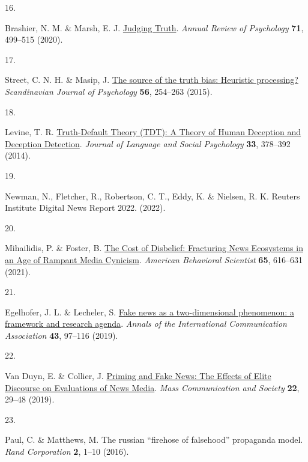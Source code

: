 \documentclass[
  doc,floatsintext]{apa6}
\newlength{\cslhangindent}
\newlength{\csllabelwidth}
\newenvironment{CSLReferences}[2] %
 {\begin{list}{}{%
  \setlength{\itemindent}{0pt}
  \setlength{\leftmargin}{0pt}
  \setlength{\parsep}{0pt}
  \ifodd #1
   \setlength{\leftmargin}{\cslhangindent}
   \setlength{\itemindent}{-1\cslhangindent}
  \fi
  \setlength{\itemsep}{#2\baselineskip}}}
 {\end{list}}
\newcommand{\CSLLeftMargin}[1]{\parbox[t]{\csllabelwidth}{\strut#1\strut}}
\newcommand{\CSLRightInline}[1]{\parbox[t]{\linewidth - \csllabelwidth}{\strut#1\strut}}
\begin{document}
\begin{CSLReferences}{0}{0}
\CSLLeftMargin{16. }%
\CSLRightInline{Brashier, N. M. \& Marsh, E. J. \href{https://doi.org/10.1146/annurev-psych-010419-050807}{Judging Truth}. \emph{Annual Review of Psychology} \textbf{71}, 499--515 (2020).}

\CSLLeftMargin{17. }%
\CSLRightInline{Street, C. N. H. \& Masip, J. \href{https://doi.org/10.1111/sjop.12204}{The source of the truth bias: Heuristic processing?} \emph{Scandinavian Journal of Psychology} \textbf{56}, 254--263 (2015).}

\CSLLeftMargin{18. }%
\CSLRightInline{Levine, T. R. \href{https://doi.org/10.1177/0261927X14535916}{Truth-Default Theory (TDT): A Theory of Human Deception and Deception Detection}. \emph{Journal of Language and Social Psychology} \textbf{33}, 378--392 (2014).}

\CSLLeftMargin{19. }%
\CSLRightInline{Newman, N., Fletcher, R., Robertson, C. T., Eddy, K. \& Nielsen, R. K. Reuters Institute Digital News Report 2022. (2022).}

\CSLLeftMargin{20. }%
\CSLRightInline{Mihailidis, P. \& Foster, B. \href{https://doi.org/10.1177/0002764220978470}{The Cost of Disbelief: Fracturing News Ecosystems in an Age of Rampant Media Cynicism}. \emph{American Behavioral Scientist} \textbf{65}, 616--631 (2021).}

\CSLLeftMargin{21. }%
\CSLRightInline{Egelhofer, J. L. \& Lecheler, S. \href{https://doi.org/10.1080/23808985.2019.1602782}{Fake news as a two-dimensional phenomenon: a framework and research agenda}. \emph{Annals of the International Communication Association} \textbf{43}, 97--116 (2019).}

\CSLLeftMargin{22. }%
\CSLRightInline{Van Duyn, E. \& Collier, J. \href{https://doi.org/10.1080/15205436.2018.1511807}{Priming and Fake News: The Effects of Elite Discourse on Evaluations of News Media}. \emph{Mass Communication and Society} \textbf{22}, 29--48 (2019).}

\CSLLeftMargin{23. }%
\CSLRightInline{Paul, C. \& Matthews, M. The russian {``}firehose of falsehood{''} propaganda model. \emph{Rand Corporation} \textbf{2}, 1--10 (2016).}


\end{CSLReferences}
\end{document}
